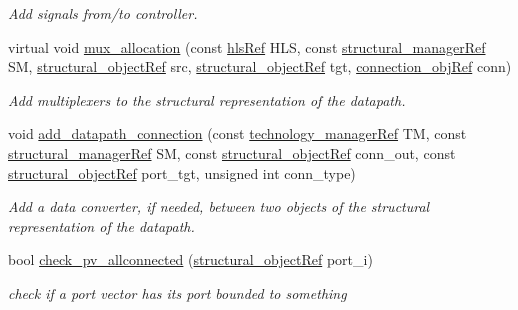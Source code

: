 \begin{DoxyCompactItemize}
\begin{DoxyCompactList}\small\item\em Add signals from/to controller. \end{DoxyCompactList}\item 
virtual void \hyperlink{classconn__binding_a58f8b4130f06326232baabc4cf18730e}{mux\+\_\+allocation} (const \hyperlink{hls_8hpp_a75d0c73923d0ddfa28c4843a802c73a7}{hls\+Ref} H\+LS, const \hyperlink{structural__manager_8hpp_ab3136f0e785d8535f8d252a7b53db5b5}{structural\+\_\+manager\+Ref} SM, \hyperlink{structural__objects_8hpp_a8ea5f8cc50ab8f4c31e2751074ff60b2}{structural\+\_\+object\+Ref} src, \hyperlink{structural__objects_8hpp_a8ea5f8cc50ab8f4c31e2751074ff60b2}{structural\+\_\+object\+Ref} tgt, \hyperlink{connection__obj_8hpp_af3c6e389c8543ed97dd9ba412f2c141b}{connection\+\_\+obj\+Ref} conn)
\begin{DoxyCompactList}\small\item\em Add multiplexers to the structural representation of the datapath. \end{DoxyCompactList}\item 
void \hyperlink{classconn__binding_a9b8d9e4a2740b3cef8f4242be0c06dda}{add\+\_\+datapath\+\_\+connection} (const \hyperlink{technology__manager_8hpp_a4b9ecd440c804109c962654f9227244e}{technology\+\_\+manager\+Ref} TM, const \hyperlink{structural__manager_8hpp_ab3136f0e785d8535f8d252a7b53db5b5}{structural\+\_\+manager\+Ref} SM, const \hyperlink{structural__objects_8hpp_a8ea5f8cc50ab8f4c31e2751074ff60b2}{structural\+\_\+object\+Ref} conn\+\_\+out, const \hyperlink{structural__objects_8hpp_a8ea5f8cc50ab8f4c31e2751074ff60b2}{structural\+\_\+object\+Ref} port\+\_\+tgt, unsigned int conn\+\_\+type)
\begin{DoxyCompactList}\small\item\em Add a data converter, if needed, between two objects of the structural representation of the datapath. \end{DoxyCompactList}\item 
bool \hyperlink{classconn__binding_af11f0bf92436cc8c5b6eb7002544f3dc}{check\+\_\+pv\+\_\+allconnected} (\hyperlink{structural__objects_8hpp_a8ea5f8cc50ab8f4c31e2751074ff60b2}{structural\+\_\+object\+Ref} port\+\_\+i)
\begin{DoxyCompactList}\small\item\em check if a port vector has its port bounded to something \end{DoxyCompactList}\end{DoxyCompactItemize}
